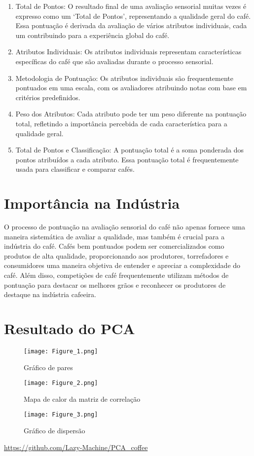 \documentclass{article}
\begin{document}
\begin{enumerate}
    \item Total de Pontos: O resultado final de uma avaliação sensorial muitas vezes é expresso como um `Total de Pontos', representando a qualidade geral do café. Essa pontuação é derivada da avaliação de vários atributos individuais, cada um contribuindo para a experiência global do café.
    \item Atributos Individuais: Os atributos individuais representam características específicas do café que são avaliadas durante o processo sensorial.
    \item Metodologia de Pontuação: Os atributos individuais são frequentemente pontuados em uma escala, com os avaliadores atribuindo notas com base em critérios predefinidos.
    \item Peso dos Atributos: Cada atributo pode ter um peso diferente na pontuação total, refletindo a importância percebida de cada característica para a qualidade geral.
    \item Total de Pontos e Classificação: A pontuação total é a soma ponderada dos pontos atribuídos a cada atributo. Essa pontuação total é frequentemente usada para classificar e comparar cafés.
\end{enumerate}

\section{Importância na Indústria}

O processo de pontuação na avaliação sensorial do café não apenas fornece uma maneira sistemática de avaliar a qualidade, mas também é crucial para a indústria do café. Cafés bem pontuados podem ser comercializados como produtos de alta qualidade, proporcionando aos produtores, torrefadores e consumidores uma maneira objetiva de entender e apreciar a complexidade do café. Além disso, competições de café frequentemente utilizam métodos de pontuação para destacar os melhores grãos e reconhecer os produtores de destaque na indústria cafeeira.

\section{Resultado do PCA}

\begin{figure}[ht]
    \centering
    \texttt{[image: Figure\_1.png]}
    \caption{Gráfico de pares}
\end{figure}

\clearpage

\begin{figure}[ht]
    \centering
    \texttt{[image: Figure\_2.png]}
    \caption{Mapa de calor da matriz de correlação}
    \texttt{[image: Figure\_3.png]}
    \caption{Gráfico de dispersão}
\end{figure}

\begin{center}
    \url{https://github.com/Lazy-Machine/PCA_coffee}
\end{center}
\end{document}
